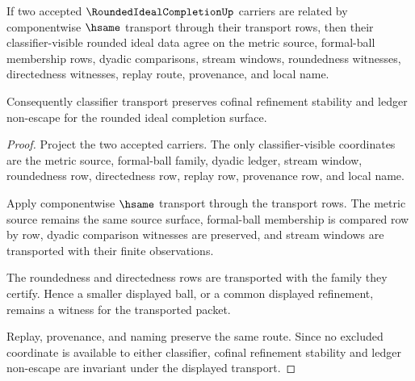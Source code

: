 \begin{theorem}
\label{thm:rounded-ideal-completion-classifier-transport}
If two accepted $\RoundedIdealCompletionUp$ carriers are related by componentwise $\hsame$ transport through their transport rows, then their classifier-visible rounded ideal data agree on the metric source, formal-ball membership rows, dyadic comparisons, stream windows, roundedness witnesses, directedness witnesses, replay route, provenance, and local name.

Consequently classifier transport preserves cofinal refinement stability and ledger non-escape for the rounded ideal completion surface.
\end{theorem}
\begin{proof}
Project the two accepted carriers. The only classifier-visible coordinates are the metric source, formal-ball family, dyadic ledger, stream window, roundedness row, directedness row, replay row, provenance row, and local name.

Apply componentwise $\hsame$ transport through the transport rows. The metric source remains the same source surface, formal-ball membership is compared row by row, dyadic comparison witnesses are preserved, and stream windows are transported with their finite observations.

The roundedness and directedness rows are transported with the family they certify. Hence a smaller displayed ball, or a common displayed refinement, remains a witness for the transported packet.

Replay, provenance, and naming preserve the same route. Since no excluded coordinate is available to either classifier, cofinal refinement stability and ledger non-escape are invariant under the displayed transport.
\end{proof}

\begin{closurestatus}{\RoundedIdealCompletionUp}
  \theoryclosure{\seedClosure}
  \formalstatus{\unformalizedV}
\end{closurestatus}
